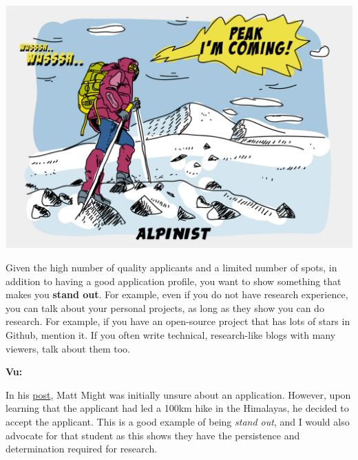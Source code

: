 \documentclass[oneside,11pt,dvipsnames]{book}
\newenvironment{commentbox}[1][]{
  \small
  \begin{mybox}
    {\small \textbf{#1}}
  }{
  \end{mybox}
}
\begin{document}
\begin{center}
  \includegraphics[scale=0.2]{files/alpinist-climbing-peak-mountain-comic-hand-drawn-vector-illustration.jpg}
\end{center}


Given the high number of quality applicants and a limited number of spots, in addition to having a good application profile, you want to show something that makes you \textbf{stand out}.  For example, even if you do not have research experience, you can talk about your personal projects, as long as they show you can do research. For example, if you have an open-source project that has lots of stars in Github, mention it. If you often write technical, research-like blogs with many viewers, talk about them too.


\begin{commentbox}[Vu:]
In his \href{https://matt.might.net/articles/how-to-apply-and-get-in-to-graduate-school-in-science-mathematics-engineering-or-computer-science/}{post}, Matt Might was initially unsure about an application. However, upon learning that the applicant had led a 100km hike in the Himalayas, he decided to accept the applicant.  This is a good example of being \emph{stand out}, and I would also advocate for that student as this shows they have the persistence and determination required for research.
\end{commentbox}

\end{document}
